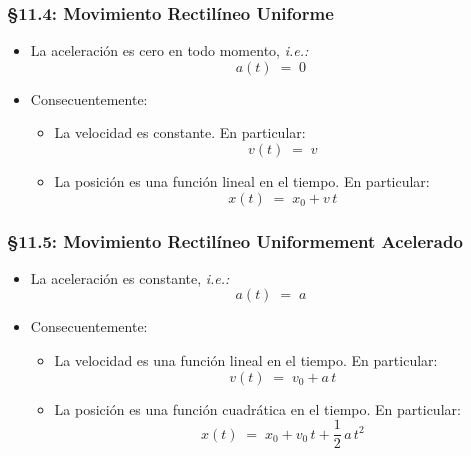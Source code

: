 \documentclass[ 10pt, xcolor = dvipsnames]{beamer}
\newcommand{\iec}{\textit{i.e.:\;}}
\begin{document}
\begin{frame}[allowframebreaks]
\frametitle{\S 11.4: Movimiento Rectil\'ineo Uniforme}

\begin{itemize}
\item La aceleraci\'on es cero en todo momento, \iec 
\[
a(t) \; = \; 0
\]
\item Consecuentemente: 
\begin{itemize}
\item La velocidad es constante. En particular: 
\[
v(t) \; = \; v
\]
\item La posici\'on es una funci\'on lineal en el tiempo. En particular: 
\[
x(t) \; = \; x_0 + v \, t
\]
\end{itemize}
\end{itemize}

\end{frame}

\begin{frame}[allowframebreaks]
\frametitle{\S 11.5: Movimiento Rectil\'ineo Uniformement Acelerado}

\begin{itemize}
\item La aceleraci\'on es constante, \iec 
\[
a(t) \; = \; a
\]
\item Consecuentemente: 
\begin{itemize}
\item La velocidad es una funci\'on lineal en el tiempo. En particular: 
\[
v(t) \; = \; v_0 + a \, t
\]
\item La posici\'on es una funci\'on cuadr\'atica en el tiempo. En particular: 
\[
x(t) \; = \; x_0 + v_0 \, t + \frac{1}{2} \, a \, t^2
\]
\end{itemize}
\end{itemize}

\end{frame}
\end{document}
